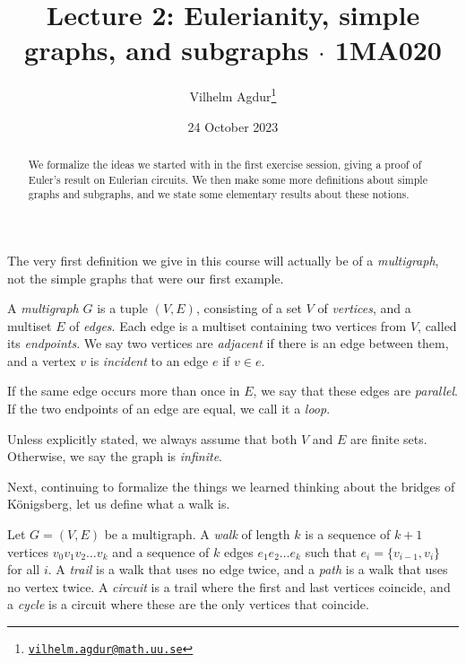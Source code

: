 \documentclass[nobib]{tufte-handout}
\title{Lecture 2: Eulerianity, simple graphs, and subgraphs $\cdot$ 1MA020}
\author[Vilhelm Agdur]{Vilhelm Agdur\thanks{\href{mailto:vilhelm.agdur@math.uu.se}{\nolinkurl{vilhelm.agdur@math.uu.se}}}}
\date{24 October 2023}
\begin{document}
\maketitle%

\begin{abstract}
\noindent
We formalize the ideas we started with in the first exercise session, giving a proof of Euler's result on Eulerian circuits. We then make some more definitions about simple graphs and subgraphs, and we state some elementary results about these notions.
\end{abstract}

The very first definition we give in this course will actually be of a \emph{multigraph}, not the simple graphs that were our first example.

\begin{definition}
    A \emph{multigraph} $G$ is a tuple $(V, E)$, consisting of a set $V$ of \emph{vertices}, and a multiset $E$ of \emph{edges}. Each edge is a multiset containing two vertices from $V$, called its \emph{endpoints}. We say two vertices are \emph{adjacent} if there is an edge between them, and a vertex $v$ is \emph{incident} to an edge $e$ if $v \in e$.

    If the same edge occurs more than once in $E$, we say that these edges are \emph{parallel}. If the two endpoints of an edge are equal, we call it a \emph{loop}.

    Unless explicitly stated, we always assume that both $V$ and $E$ are finite sets. Otherwise, we say the graph is \emph{infinite}.
\end{definition}

Next, continuing to formalize the things we learned thinking about the bridges of Königsberg, let us define what a walk is.

\begin{definition}
    Let $G = (V, E)$ be a multigraph. A \emph{walk} of length $k$ is a sequence of $k+1$ vertices $v_0 v_1 v_2\ldots v_k$ and a sequence of $k$ edges $e_1e_2\ldots e_k$ such that $e_i = \{v_{i-1}, v_i\}$ for all $i$. A \emph{trail} is a walk that uses no edge twice, and a \emph{path} is a walk that uses no vertex twice. A \emph{circuit} is a trail where the first and last vertices coincide, and a \emph{cycle} is a circuit where these are the only vertices that coincide.
\end{definition}
\end{document}
